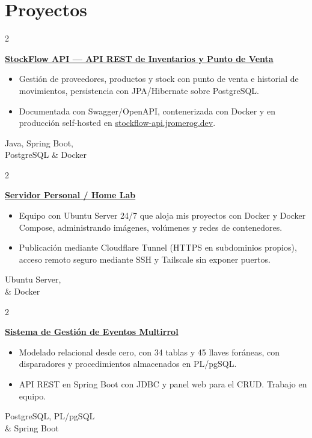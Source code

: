 \documentclass[10pt, letterpaper]{article}
\newenvironment{highlights}{
    \begin{itemize}[
        label={-},
        topsep=0pt,
        parsep=0pt,
        partopsep=0pt,
        itemsep=0pt,
        leftmargin=0.35 cm,
        labelsep=0.15 cm
    ]
}{
    \end{itemize}
}
\newenvironment{twocolentry}[2][]{
    \onecolentry
    \def\secondColumn{#2}
    \setcolumnwidth{\fill, 4.5 cm}
    \begin{paracol}{2}
}{
    \switchcolumn \raggedleft \secondColumn
    \end{paracol}
    \endonecolentry
}
\begin{document}
\section{Proyectos}

\begin{twocolentry}{
    Java, Spring Boot,\\ PostgreSQL \& Docker
}
    \textbf{\href{https://github.com/jromerog01/StockFlow-APIRest}{StockFlow API — API REST de Inventarios y Punto de Venta}}
    \begin{highlights}
        \item Gestión de proveedores, productos y stock con punto de venta e historial de movimientos, persistencia con JPA/Hibernate sobre PostgreSQL.
        \item Documentada con Swagger/OpenAPI, contenerizada con Docker y en producción self-hosted en \mbox{\href{https://stockflow-api.jromerog.dev/swagger-ui/index.html}{stockflow-api.jromerog.dev}}.
    \end{highlights}
\end{twocolentry}

\vspace{0.15 cm}

\begin{twocolentry}{
    Ubuntu Server,\\ \& Docker 
}
    \textbf{\href{https://jromerog.dev/}{Servidor Personal / Home Lab}}
    \begin{highlights}
        \item Equipo con Ubuntu Server 24/7 que aloja mis proyectos con Docker y Docker Compose, administrando imágenes, volúmenes y redes de contenedores.
        \item Publicación mediante Cloudflare Tunnel (HTTPS en subdominios propios), acceso remoto seguro mediante SSH y Tailscale sin exponer puertos.
    \end{highlights}
\end{twocolentry}

\vspace{0.15 cm}

\begin{twocolentry}{
    PostgreSQL, PL/pgSQL\\ \& Spring Boot
}
    \textbf{\href{https://github.com/jromerog01/Proyecto-Final-Bases-de-Datos}{Sistema de Gestión de Eventos Multirrol}}
    \begin{highlights}
        \item Modelado relacional desde cero, con 34 tablas y 45 llaves foráneas, con disparadores y procedimientos almacenados en PL/pgSQL.
        \item API REST en Spring Boot con JDBC y panel web para el CRUD. Trabajo en equipo.
    \end{highlights}
\end{twocolentry}
\end{document}
